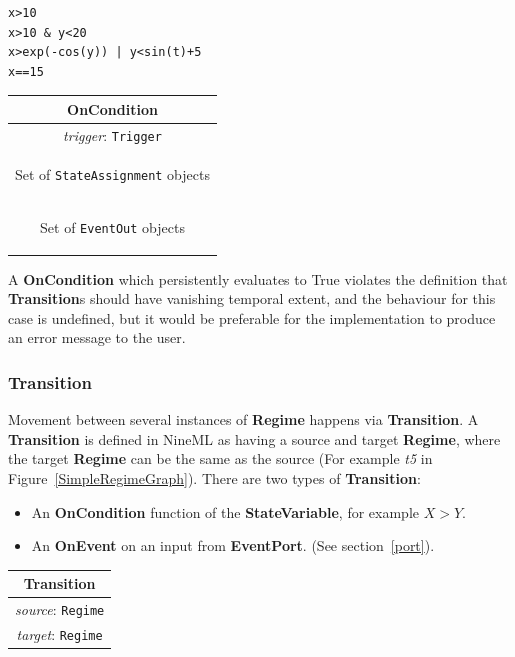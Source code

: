 \documentclass{article}
\newcommand{\nmlClass}[1]{{\bf #1}}
\newcommand{\StateVariable}{{\bf{StateVariable}}\xspace}
\newcommand{\EventPort}{{\bf{EventPort}}\xspace}
\newcommand{\Regime}{{\bf{Regime}}\xspace}
\newcommand{\Transition}{{\bf{Transition}}\xspace}
\newcommand{\OnEvent}{{\bf{OnEvent}}\xspace}
\newcommand{\OnCondition}{{\bf{OnCondition}}\xspace}
\begin{document}
\begin{verbatim}
x>10
x>10 & y<20
x>exp(-cos(y)) | y<sin(t)+5
x==15
\end{verbatim}

\begin{table}[htb]
\center
\begin{tabular}{|c|}
\hline
\hline
OnCondition \\
\hline
\hline
{\em trigger}: {\tt Trigger} \\
\hline
\colorbox{issuecolor}{\parbox{0.4\linewidth}
{\center Set of {\tt StateAssignment} objects}} \\
\hline
\colorbox{issuecolor}{\parbox{0.4\linewidth}
{\center Set of {\tt EventOut} objects}} \\
\hline
\end{tabular}
\end{table}

A \nmlClass{OnCondition} which persistently evaluates to True violates
the definition that \nmlClass{Transition}s should have vanishing
temporal extent, and the behaviour for this case is undefined, but it
would be preferable for the implementation to produce an error message
to the user.

\subsubsection{Transition}
\label{transition}

Movement between several instances of \Regime happens via \Transition.
A \nmlClass{Transition} is defined in NineML as having
a source and target \nmlClass{Regime}, where the target
\nmlClass{Regime} can be the same as the source (For example \emph{t5}
in Figure~\ref{SimpleRegimeGraph}). There are two types of \Transition:

\begin{itemize}
\item An \OnCondition function of the \StateVariable, for
example $X > Y$.
\item An \OnEvent on an input from \EventPort. (See section~\ref{port}).
\end{itemize}

\begin{table}[htb]
\center
\begin{tabular}{|c|}
\hline
\hline
Transition \\
\hline
\hline
{\em source}: {\tt Regime} \\
\hline
{\em target}: {\tt Regime} \\
\hline
\end{tabular}
\end{table}
\end{document}
